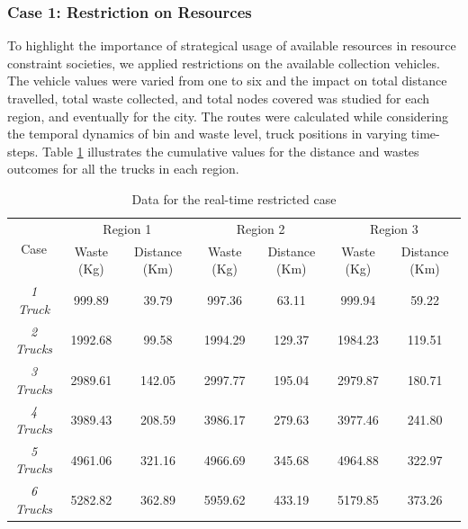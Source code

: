 \documentclass[12pt]{article}
\begin{document}
\subsubsection*{Case 1: Restriction on Resources}
To highlight the importance of strategical usage of available resources in resource constraint societies, we applied restrictions on the available collection vehicles. The vehicle values were varied from one to six and the impact on total distance travelled, total waste collected, and total nodes covered was studied for each region, and  eventually for the city. The routes were calculated while considering the temporal dynamics of bin and waste level, truck positions in varying time-steps. Table \ref{tab1} illustrates the cumulative values for the distance and wastes outcomes for all the trucks in each region.
\begin{table}[H]
    \centering
    \caption{Data for the real-time restricted case} \label{tab1}
    \vspace*{0.3cm}
    \hspace*{-1cm}
    \begin{tabular}{|c|c|c|c|c|c|c|}
        \hline \multirow{2}{*}{Case} & \multicolumn{2}{c|}{Region 1} & \multicolumn{2}{c|}{Region 2} & \multicolumn{2}{c|}{Region 3}\\
        \cline{2-7}& Waste (Kg)  & Distance (Km) & Waste (Kg) & Distance (Km) & Waste (Kg) & Distance (Km)\\ 
        \hline \textit{1 Truck} & 999.89 & 39.79 & 997.36 & 63.11 & 999.94 & 59.22 \\
        \hline \textit{2 Trucks} & 1992.68& 99.58 & 1994.29 & 129.37 & 1984.23& 119.51 \\
        \hline \textit{3 Trucks} & 2989.61 & 142.05 & 2997.77 & 195.04 & 2979.87 & 180.71 \\
        \hline \textit{4 Trucks} & 3989.43 & 208.59 & 3986.17 & 279.63 & 3977.46 & 241.80 \\
        \hline \textit{5 Trucks} & 4961.06 & 321.16 & 4966.69 & 345.68 & 4964.88 & 322.97 \\
        \hline \textit{6 Trucks} & 5282.82 & 362.89 & 5959.62 & 433.19 & 5179.85 & 373.26 \\
        \hline
    \end{tabular}
\end{table}
\end{document}
